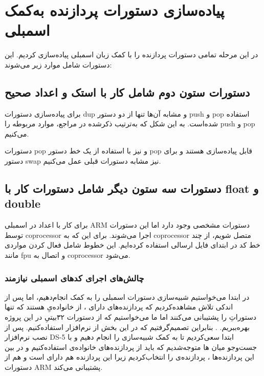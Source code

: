 \section*{پیاده‌سازی دستورات پردازنده به‌کمک
	اسمبلی
}

در این مرحله تمامی دستورات پردازنده را با کمک زبان اسمبلی
پیاده‌سازی کردیم. این دستورات شامل موارد زیر می‌شوند:

\subsection*{دستورات ستون دوم شامل کار با استک و اعداد صحیح}

برای پیاده‌سازی دستورات dup و مشابه آن‌ها تنها از دو دستور push و pop استفاده شده‌است. به این شکل که به‌ترتیب ذکرشده در مراجع، موارد مربوطه را push و pop می‌کنیم.

دستورات pop
و
نیز با استفاده از یک خط دستور pop قابل پیاده‌سازی هستند و برای دستور swap نیز مشابه دستورات قبلی عمل می‌کنیم.

\subsection*{دستورات سه ستون دیگر شامل دستورات کار با float و double}

برای کار با اعداد 
در اسمبلی
ARM دستورات مشخصی وجود دارد اما این دستورات توسط coprocessor اجرا می‌شوند. برای این که به coprocessor متصل شویم، از چند خط کد در ابتدای فایل 
ارسالی استفاده کرده‌ایم. این خطوط شامل فعال کردن مواردی مانند fpu و اتصال به coprocessor می‌شود.

\subsubsection*{چالش‌های اجرای کدهای اسمبلی نیازمند
}
در ابتدا می‌خواستیم شبیه‌سازی دستورات اسمبلی را به کمک
 انجام‌دهیم، اما پس از اندکی تلاش مشاهده‌کردیم که پردازنده‌های دارای
،
 از خانواده‌یِ
هستند که تنها دستوراتِ
  را پشتیبانی می‌کنند اما ما می‌خواستیم که از دستورات ۳۲بیتیِ
   در این پروژه بهره‌ببریم.
  .
  بنابراین تصمیم‌گرفتیم که در این بخش از نرم‌افزار
   استفاده‌کنیم. پس از نصب نرم‌افزار DS-5 ابتدا سعی‌کردیم تا به کمک 
    شبیه‌سازی را انجام دهیم و با جست‌وجو میان
ها
 متوجه‌شدیم که باید از پردازنده‌های خانواده‌ی
 استفاده‌کنیم و در بین این پردازنده‌ها ، پردازنده‌ی
 را انتخاب‌کردیم زیرا این پردازنده هم دارای
 است و هم از دستورات ARM پشتیبانی می‌کند.

